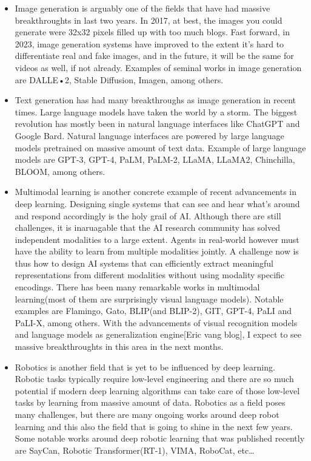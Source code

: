 \documentclass[
  letterpaper,
  DIV=11,
  numbers=noendperiod]{scrartcl}
\begin{document}
\begin{itemize}
\item
  Image generation is arguably one of the fields that have had massive
  breakthroughts in last two years. In 2017, at best, the images you
  could generate were 32x32 pixels filled up with too much blogs. Fast
  forward, in 2023, image generation systems have improved to the extent
  it's hard to differentiate real and fake images, and in the future, it
  will be the same for videos as well, if not already. Examples of
  seminal works in image generation are DALLE•2, Stable Diffusion,
  Imagen, among others.
\item
  Text generation has had many breakthroughs as image generation in
  recent times. Large language models have taken the world by a storm.
  The biggest revolution has mostly been in natural language interfaces
  like ChatGPT and Google Bard. Natural language interfaces are powered
  by large language models pretrained on massive amount of text data.
  Example of large language models are GPT-3, GPT-4, PaLM, PaLM-2,
  LLaMA, LLaMA2, Chinchilla, BLOOM, among others.
\item
  Multimodal learning is another concrete example of recent advancements
  in deep learning. Designing single systems that can see and hear
  what's around and respond accordingly is the holy grail of AI.
  Although there are still challenges, it is inaruagable that the AI
  research community has solved independent modalities to a large
  extent. Agents in real-world however must have the ability to learn
  from multiple modalities jointly. A challenge now is thus how to
  design AI systems that can efficiently extract meaningful
  representations from different modalities without using modality
  specific encodings. There has been many remarkable works in multimodal
  learning(most of them are surprisingly visual language models).
  Notable examples are Flamingo, Gato, BLIP(and BLIP-2), GIT, GPT-4,
  PaLI and PaLI-X, among others. With the advancements of visual
  recognition models and language models as generalization engine{[}Eric
  vang blog{]}, I expect to see massive breakthroughts in this area in
  the next months.
\item
  Robotics is another field that is yet to be influenced by deep
  learning. Robotic tasks typically require low-level engineering and
  there are so much potential if modern deep learning algorithms can
  take care of those low-level tasks by learning from massive amount of
  data. Robotics as a field poses many challenges, but there are many
  ongoing works around deep robot learning and this also the field that
  is going to shine in the next few years. Some notable works around
  deep robotic learning that was published recently are SayCan, Robotic
  Transformer(RT-1), VIMA, RoboCat, etc\ldots{}
\end{itemize}
\end{document}
